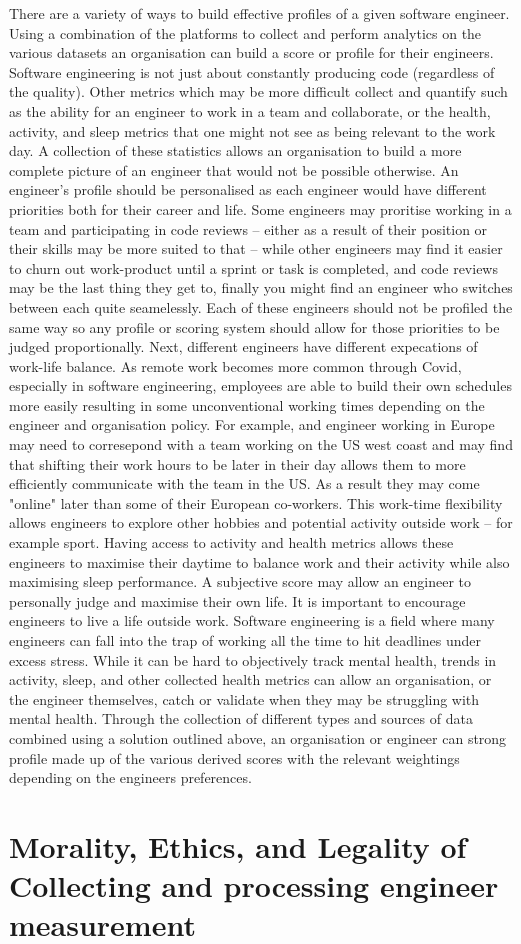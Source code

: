 \documentclass[12pt]{article}
\begin{document}
    There are a variety of ways to build effective profiles of a given software engineer. Using a combination of the platforms to collect and perform analytics on the various datasets an organisation can build a score or profile for their engineers. Software engineering is not just about constantly producing code (regardless of the quality). Other metrics which may be more difficult collect and quantify such as the ability for an engineer to work in a team and collaborate, or the health, activity, and sleep metrics that one might not see as being relevant to the work day. A collection of these statistics allows an organisation to build a more complete picture of an engineer that would not be possible otherwise. An engineer's profile should be personalised as each engineer would have different priorities both for their career and life. Some engineers may proritise working in a team and participating in code reviews -- either as a result of their position or their skills may be more suited to that -- while other engineers may find it easier to churn out work-product until a sprint or task is completed, and code reviews may be the last thing they get to, finally you might find an engineer who switches between each quite seamelessly. Each of these engineers should not be profiled the same way so any profile or scoring system should allow for those priorities to be judged proportionally. Next, different engineers have different expecations of work-life balance. As remote work becomes more common through Covid, especially in software engineering, employees are able to build their own schedules more easily resulting in some unconventional working times depending on the engineer and organisation policy. For example, and engineer working in Europe may need to corresepond with a team working on the US west coast and may find that shifting their work hours to be later in their day allows them to more efficiently communicate with the team in the US. As a result they may come "online" later than some of their European co-workers. This work-time flexibility allows engineers to explore other hobbies and potential activity outside work -- for example sport. Having access to activity and health metrics allows these engineers to maximise their daytime to balance work and their activity while also maximising sleep performance. A subjective score may allow an engineer to personally judge and maximise their own life. It is important to encourage engineers to live a life outside work. Software engineering is a field where many engineers can fall into the trap of working all the time to hit deadlines under excess stress. While it can be hard to objectively track mental health, trends in activity, sleep, and other collected health metrics can allow an organisation, or the engineer themselves, catch or validate when they may be struggling with mental health.\newline
    Through the collection of different types and sources of data combined using a solution outlined above, an organisation or engineer can strong profile made up of the various derived scores with the relevant weightings depending on the engineers preferences.

    \section{Morality, Ethics, and Legality of Collecting and processing engineer measurement}
    
    
    
\end{document}
